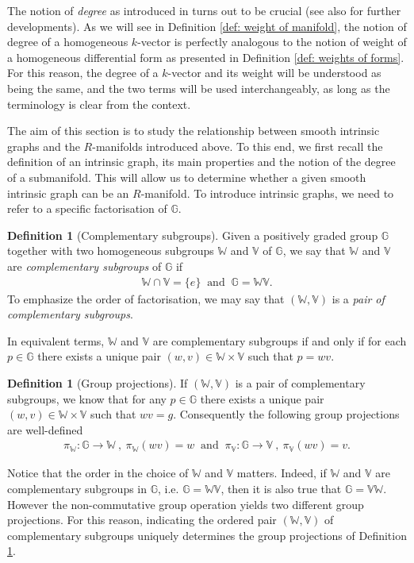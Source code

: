 \documentclass[dvipsnames]{amsart}
\theoremstyle{definition}
\newtheorem{definition}[theorem]{Definition}
\theoremstyle{definition}
\numberwithin{equation}{section}
\newcommand{\W}{\mathbb{W}}
\newcommand{\V}{\mathbb{V}}
\newcommand{\G}{\mathbb{G}}
\begin{document}
The notion of \textit{degree} as introduced in \cite{Mag13Vit} turns out to be crucial (see also \cite{Magnani2019Area,Mag22RS,CorMag25} for further developments). As we will see in Definition \ref{def: weight of manifold}, the notion of degree of a homogeneous $k$-vector is perfectly analogous to the notion of weight of a homogeneous differential form as presented in Definition \ref{def: weights of forms}. For this reason, the degree of a $k$-vector and its weight will be understood as being the same, and the two terms will be used interchangeably, as long as the terminology is clear from the context.

The aim of this section is to study the relationship between smooth intrinsic graphs and the $R$-manifolds introduced above. To this end, we first recall the definition of an intrinsic graph, its main properties and the notion of the degree of a submanifold. This will allow us to determine whether a given smooth intrinsic graph can be an $R$-manifold. 
To introduce intrinsic graphs, we need to refer to a specific factorisation of $\G$.

\begin{definition}[Complementary subgroups]\label{def: complementary subgroups} Given a positively graded group $\G$ together with two homogeneous subgroups $\W$ and $\V$ of $\G$, we say that $\W$ and $\V$ are {\em complementary subgroups} of $\G$ if
\begin{align*}
    \W\cap\V=\{e\}\ \text{ and }\ \G=\W\V.
\end{align*}
To emphasize the order of factorisation, we may say that $(\W,\V)$ is a {\em pair of complementary subgroups}.
\end{definition}
In equivalent terms, $\W$ and $\V$ are complementary subgroups if and only if for each $p\in\G$ there exists a unique pair $(w,v)\in\W\times\V$ such that $p=wv$. 
\begin{definition}[Group projections]\label{def: group proj} 
If $(\W,\V)$ is a pair of complementary subgroups, we know that for any $p\in\G$ there exists a unique pair $(w,v)\in\W\times\V$ such that $w v=g$. Consequently the following group projections are well-defined
\begin{align}
    \pi_\W\colon\G\to\W\ ,\ \pi_\W(w v)=w\ \text{ and }\  \pi_\V\colon\G\to\V\ ,\ \pi_\V(w v)=v.
\end{align}
\end{definition}
Notice that the order in the choice of $\W$ and $\V$ matters. Indeed, if $\W$ and $\V$ are complementary subgroups in $\G$, i.e. $\G=\W\V$, then it is also true that $\G=\V\W$. However the non-commutative group operation yields two different group projections. For this reason, indicating the ordered pair $(\W,\V)$ of complementary subgroups uniquely determines the group projections of Definition \ref{def: group proj}. 
\end{document}

